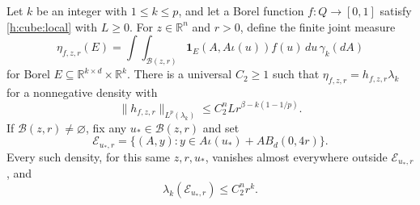 \begin{lemma}
\label{h:cube:density}
Let \(k\) be an integer with \(1\le k\le p\), and let a Borel function
\(f:Q\to[0,1]\) satisfy \eqref{h:cube:local} with \(L\ge0\).
For \(z\in\mathbb R^n\) and \(r>0\), define the finite joint measure
\begin{equation}\label{h:cube:joint-measure}
 \eta_{f,z,r}(E)
 =\int\!\int_{\mathcal B(z,r)}
       \mathbf 1_E(A,A\iota(u))f(u)\,du\,\gamma_k(dA)
\end{equation}
for Borel \(E\subseteq\mathbb R^{k\times d}\times\mathbb R^k\).
There is a universal \(C_2\ge1\) such that
\(\eta_{f,z,r}=h_{f,z,r}\lambda_k\) for a nonnegative density with
\begin{equation}\label{h:cube:density-bound}
 \|h_{f,z,r}\|_{L^p(\lambda_k)}
 \le C_2^n Lr^{\beta-k(1-1/p)}.
\end{equation}
If \(\mathcal B(z,r)\ne\varnothing\), fix any
\(u_*\in\mathcal B(z,r)\) and set
\begin{equation}\label{h:cube:ellipsoid-support}
 \mathcal E_{u_*,r}
 =\{(A,y):y\in A\iota(u_*)+A B_d(0,4r)\}.
\end{equation}
Every such density, for this same \(z,r,u_*\), vanishes almost
everywhere outside \(\mathcal E_{u_*,r}\), and
\begin{equation}\label{h:cube:ellipsoid-volume}
 \lambda_k(\mathcal E_{u_*,r})\le C_2^n r^k.
\end{equation}
\end{lemma}

